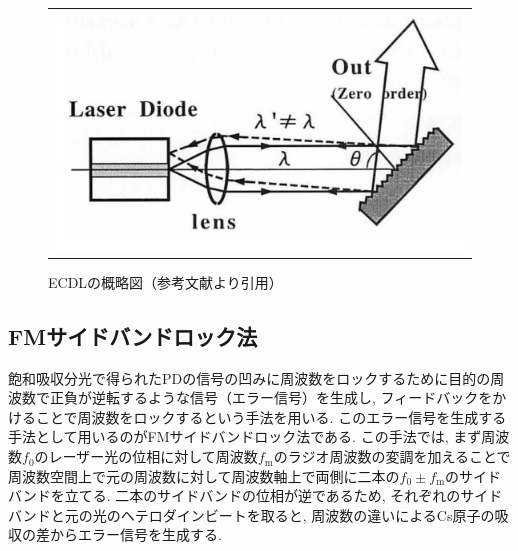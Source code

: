\documentclass[uplatex, dvipdfmx, a4paper, report, papersize, 11pt]{jsbook}
\begin{document}
\begin{figure}[htpb]
  \centering
    \begin{tabular}{c}
      \begin{minipage}{1\hsize}
        \centering
          \includegraphics[keepaspectratio,  scale=0.35,  angle=0]
                          {figures/saturated-absorption/ECDL_diagram.png}
                          \caption{ECDLの概略図（参考文献\cite{ECDL}より引用）}
                          \label{ECDL_diagram}
      \end{minipage}
    \end{tabular}
\end{figure}
\subsection{FMサイドバンドロック法}
飽和吸収分光で得られたPDの信号の凹みに周波数をロックするために目的の周波数で正負が逆転するような信号（エラー信号）を生成し, フィードバックをかけることで周波数をロックするという手法を用いる. このエラー信号を生成する手法として用いるのがFMサイドバンドロック法である. この手法では, まず周波数$f_\mathrm{0}$のレーザー光の位相に対して周波数$f_\mathrm{m}$のラジオ周波数の変調を加えることで周波数空間上で元の周波数に対して周波数軸上で両側に二本の$f_\mathrm{0} \pm f_\mathrm{m}$のサイドバンドを立てる. 二本のサイドバンドの位相が逆であるため, それぞれのサイドバンドと元の光のヘテロダインビートを取ると, 周波数の違いによるCs原子の吸収の差からエラー信号を生成する.
\end{document}
